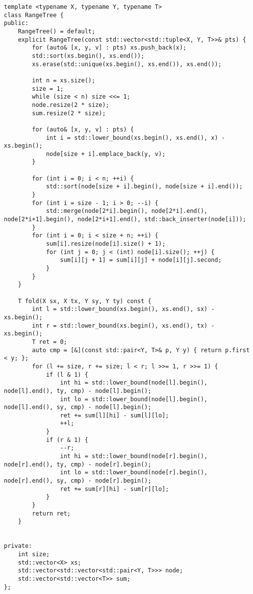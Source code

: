 \begin{lstlisting}
template <typename X, typename Y, typename T>
class RangeTree {
public:
    RangeTree() = default;
    explicit RangeTree(const std::vector<std::tuple<X, Y, T>>& pts) {
        for (auto& [x, y, v] : pts) xs.push_back(x);
        std::sort(xs.begin(), xs.end());
        xs.erase(std::unique(xs.begin(), xs.end()), xs.end());

        int n = xs.size();
        size = 1;
        while (size < n) size <<= 1;
        node.resize(2 * size);
        sum.resize(2 * size);

        for (auto& [x, y, v] : pts) {
            int i = std::lower_bound(xs.begin(), xs.end(), x) - xs.begin();
            node[size + i].emplace_back(y, v);
        }

        for (int i = 0; i < n; ++i) {
            std::sort(node[size + i].begin(), node[size + i].end());
        }
        for (int i = size - 1; i > 0; --i) {
            std::merge(node[2*i].begin(), node[2*i].end(), node[2*i+1].begin(), node[2*i+1].end(), std::back_inserter(node[i]));
        }
        for (int i = 0; i < size + n; ++i) {
            sum[i].resize(node[i].size() + 1);
            for (int j = 0; j < (int) node[i].size(); ++j) {
                sum[i][j + 1] = sum[i][j] + node[i][j].second;
            }
        }
    }

    T fold(X sx, X tx, Y sy, Y ty) const {
        int l = std::lower_bound(xs.begin(), xs.end(), sx) - xs.begin();
        int r = std::lower_bound(xs.begin(), xs.end(), tx) - xs.begin();
        T ret = 0;
        auto cmp = [&](const std::pair<Y, T>& p, Y y) { return p.first < y; };
        for (l += size, r += size; l < r; l >>= 1, r >>= 1) {
            if (l & 1) {
                int hi = std::lower_bound(node[l].begin(), node[l].end(), ty, cmp) - node[l].begin();
                int lo = std::lower_bound(node[l].begin(), node[l].end(), sy, cmp) - node[l].begin();
                ret += sum[l][hi] - sum[l][lo];
                ++l;
            }
            if (r & 1) {
                --r;
                int hi = std::lower_bound(node[r].begin(), node[r].end(), ty, cmp) - node[r].begin();
                int lo = std::lower_bound(node[r].begin(), node[r].end(), sy, cmp) - node[r].begin();
                ret += sum[r][hi] - sum[r][lo];
            }
        }
        return ret;
    }


private:
    int size;
    std::vector<X> xs;
    std::vector<std::vector<std::pair<Y, T>>> node;
    std::vector<std::vector<T>> sum;
};

\end{lstlisting}

